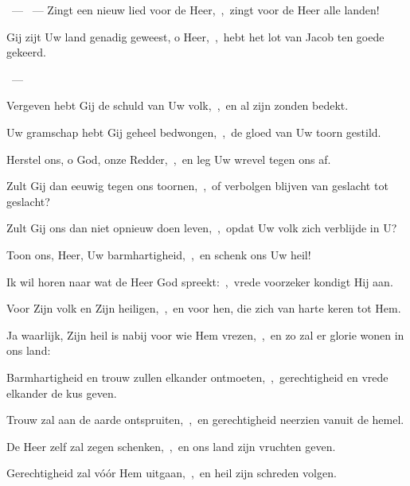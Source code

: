 \documentclass[12pt,twoside,a5paper]{article}
\begin{document}
\begin{halfparskip}
  ~--- ~---  Zingt een nieuw lied voor de Heer,~\sep\ zingt voor de Heer alle landen!
\end{halfparskip}

\begin{halfparskip}
   
\end{halfparskip}

\begin{halfparskip}
   Gij zijt Uw land genadig geweest, o Heer,~\sep\ hebt het lot van Jacob ten goede gekeerd.

  ~--- 

  Vergeven hebt Gij de schuld van Uw volk,~\sep\ en al zijn zonden bedekt.

  Uw gramschap hebt Gij geheel bedwongen,~\sep\ de gloed van Uw toorn gestild.

  Herstel ons, o God, onze Redder,~\sep\ en leg Uw wrevel tegen ons af.

  Zult Gij dan eeuwig tegen ons toornen,~\sep\ of verbolgen blijven van geslacht tot geslacht?

  Zult Gij ons dan niet opnieuw doen leven,~\sep\ opdat Uw volk zich verblijde in U?

  Toon ons, Heer, Uw barmhartigheid,~\sep\ en schenk ons Uw heil!

  Ik wil horen naar wat de Heer God spreekt:~\sep\ vrede voorzeker kondigt Hij aan.

  Voor Zijn volk en Zijn heiligen,~\sep\ en voor hen, die zich van harte keren tot Hem.

  Ja waarlijk, Zijn heil is nabij voor wie Hem vrezen,~\sep\ en zo zal er glorie wonen in ons land:

  Barmhartigheid en trouw zullen elkander ontmoeten,~\sep\ gerechtigheid en vrede elkander de kus geven.

  Trouw zal aan de aarde ontspruiten,~\sep\ en gerechtigheid neerzien vanuit de hemel.

  De Heer zelf zal zegen schenken,~\sep\ en ons land zijn vruchten geven.

  Gerechtigheid zal vóór Hem uitgaan,~\sep\ en heil zijn schreden volgen.
\end{halfparskip}
\end{document}
